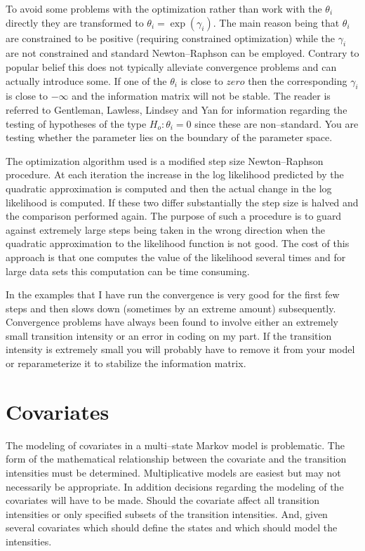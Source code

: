 \documentclass[12pt]{article}
\begin{document}
To avoid some problems with the optimization rather than work with
the $\theta_i$ directly they are transformed to $\theta_i = \exp( \gamma_i)$.
The main reason being that $\theta_i$ are constrained to be positive
(requiring constrained optimization) while the $\gamma_i$ are
not constrained and standard Newton--Raphson can be employed.
Contrary to popular belief
this does not typically alleviate convergence problems and can actually
introduce some.
If one of the $\theta_i$ is close to $zero$ then the corresponding $\gamma_i$
is close to $-\infty$ and the information matrix will not be stable.
The reader is referred to Gentleman, Lawless, Lindsey and Yan for information
regarding the testing of hypotheses of the type $H_o: \theta_i = 0$ since
these are non--standard. You are testing whether the parameter
lies on the boundary of the parameter space.

The optimization algorithm used is a modified step size 
Newton--Raphson procedure.
At each iteration the increase in the log likelihood predicted by the quadratic
approximation is computed and then the actual change in the log likelihood
is computed. If these two differ substantially the step size is halved and the
comparison performed again.
The purpose of such a procedure is to guard against extremely large steps
being taken in the wrong direction when the quadratic approximation to the
likelihood function is not good.
The cost of this approach is that one computes the value of the likelihood
several times and for large data sets this computation can be time consuming.

In the examples that I have run the convergence is very good for the first
few steps and then slows down (sometimes by an extreme amount) subsequently.
Convergence problems have always been found to involve either an extremely
small transition intensity or an error in coding on my part.
If the transition intensity is extremely small you will probably have to 
remove it from your model or reparameterize it to stabilize the information
matrix.

\section{Covariates}

The modeling of covariates in a multi--state Markov model is problematic. 
The form of
the mathematical relationship between the covariate and the transition
intensities must be determined. 
Multiplicative models are easiest but may not necessarily be appropriate.
In addition decisions regarding the modeling of the covariates will
have to be made.
Should the covariate affect all transition intensities
or only specified subsets of the transition intensities.
And, given several covariates which should define the states and which should
model the intensities.
\end{document}
